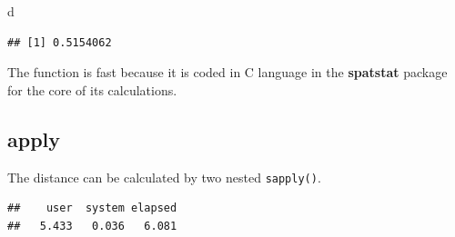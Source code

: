 \documentclass[
  12pt,
  american,
  a4paper,
  extrafontsizes,onecolumn,openright
  ]{memoir}
\newenvironment{Shaded}{\begin{snugshade}}{\end{snugshade}}
\newcommand{\ControlFlowTok}[1]{\textcolor[rgb]{0.13,0.29,0.53}{\textbf{#1}}}
\newcommand{\DecValTok}[1]{\textcolor[rgb]{0.00,0.00,0.81}{#1}}
\newcommand{\FunctionTok}[1]{\textcolor[rgb]{0.00,0.00,0.00}{#1}}
\newcommand{\NormalTok}[1]{#1}
\newcommand{\OtherTok}[1]{\textcolor[rgb]{0.56,0.35,0.01}{#1}}
\newcommand{\SpecialCharTok}[1]{\textcolor[rgb]{0.00,0.00,0.00}{#1}}
\begin{document}
\begin{Shaded}
\begin{Highlighting}[]
\NormalTok{d}
\end{Highlighting}
\end{Shaded}

\begin{verbatim}
## [1] 0.5154062
\end{verbatim}

\normalsize

The function is fast because it is coded in C language in the \textbf{spatstat} package for the core of its calculations.

\hypertarget{apply}{%
\subsection{apply}\label{apply}}

The distance can be calculated by two nested \texttt{sapply()}.

\scriptsize

\begin{Shaded}
\end{Shaded}

\begin{verbatim}
##    user  system elapsed 
##   5.433   0.036   6.081
\end{verbatim}
\end{document}
